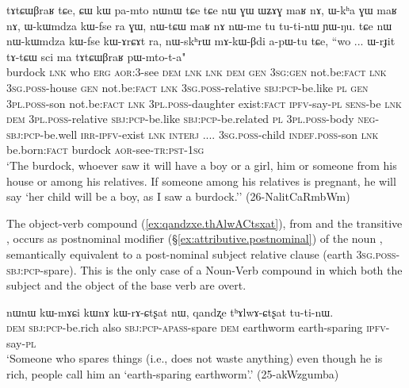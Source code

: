 \begin{exe}
\ex \label{ex:tAtCWBraR}
\gll tɤtɕɯβraʁ tɕe, ɕɯ kɯ pa-mto nɯnɯ tɕe tɕe nɯ ɣɯ ɯʑɤɣ maʁ nɤ, ɯ-kʰa ɣɯ maʁ nɤ, ɯ-kɯmdza kɯ-fse ra ɣɯ, nɯ-tɕɯ maʁ nɤ nɯ-me tu tu-ti-nɯ ɲɯ-ŋu. tɕe nɯ nɯ-kɯmdza kɯ-fse kɯ-ɤrɕɤt ra, nɯ-skʰrɯ mɤ-kɯ-βdi a-pɯ-tu tɕe, ``wo ... ɯ-rɟit tɤ-tɕɯ sci ma tɤtɕɯβraʁ pɯ-mto-t-a" \\
burdock \textsc{lnk} who \textsc{erg} \textsc{aor}:3\flobv{}-see \textsc{dem} \textsc{lnk} \textsc{lnk} \textsc{dem} \textsc{gen} \textsc{3sg}:\textsc{gen} not.be:\textsc{fact} \textsc{lnk} \textsc{3sg}.\textsc{poss}-house \textsc{gen} not.be:\textsc{fact} \textsc{lnk} \textsc{3sg}.\textsc{poss}-relative \textsc{sbj}:\textsc{pcp}-be.like \textsc{pl} \textsc{gen} \textsc{3pl}.\textsc{poss}-son not.be:\textsc{fact} \textsc{lnk} \textsc{3pl}.\textsc{poss}-daughter exist:\textsc{fact} \textsc{ipfv}-say-\textsc{pl} \textsc{sens}-be \textsc{lnk} \textsc{dem} \textsc{3pl}.\textsc{poss}-relative \textsc{sbj}:\textsc{pcp}-be.like \textsc{sbj}:\textsc{pcp}-be.related \textsc{pl} \textsc{3pl}.\textsc{poss}-body \textsc{neg}-\textsc{sbj}:\textsc{pcp}-be.well \textsc{irr}-\textsc{ipfv}-exist \textsc{lnk} \textsc{interj} .... \textsc{3sg}.\textsc{poss}-child \textsc{indef}.\textsc{poss}-son \textsc{lnk} be.born:\textsc{fact} burdock \textsc{aor}-see-\textsc{tr}:\textsc{pst}-\textsc{1sg} \\
\glt `The burdock, whoever saw it will have a boy or a girl, him or someone from his house or among his relatives. If someone among his relatives is pregnant, he will say `her child will be a boy, as I saw a burdock.'' (26-NalitCaRmbWm)
\end{exe}

The object-verb compound  (\ref{ex:qandzxe.thAlwACtsxat}), from  and the transitive , occurs as postnominal modifier (§\ref{ex:attributive.postnominal}) of the noun , semantically equivalent to a post-nominal subject relative clause  (earth \textsc{3sg}.\textsc{poss}-\textsc{sbj}:\textsc{pcp}-spare). This is the only case of a Noun-Verb compound in which both the subject and the object of the base verb are overt.

\begin{exe}
\ex \label{ex:qandzxe.thAlwACtsxat}
\gll nɯnɯ kɯ-mɤɕi kɯnɤ kɯ-rɤ-ɕtʂat nɯ, qandʐe tʰɤlwɤ-ɕtʂat tu-ti-nɯ. \\
\textsc{dem} \textsc{sbj}:\textsc{pcp}-be.rich also \textsc{sbj}:\textsc{pcp}-\textsc{apass}-spare \textsc{dem} earthworm earth-sparing \textsc{ipfv}-say-\textsc{pl} \\
\glt `Someone who spares things (i.e., does not waste anything) even though he is rich, people call him an `earth-sparing earthworm'.' (25-akWzgumba) 
\end{exe}

